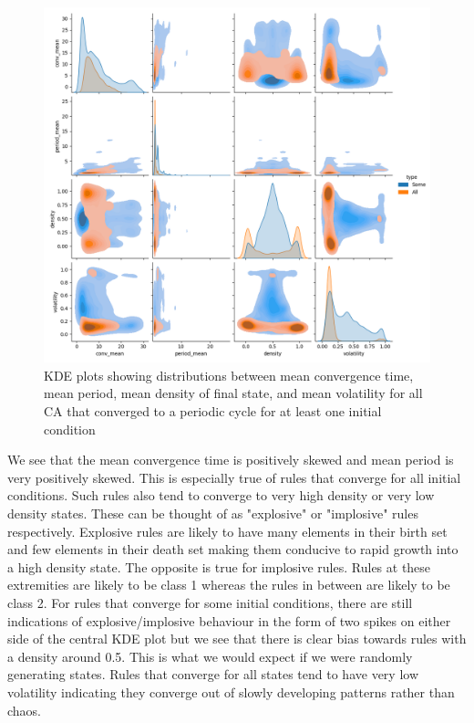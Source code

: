 \begin{figure}[!h]
\centering 
\includegraphics[width=\textwidth]{images/tax-pairplot.png}
\caption{KDE plots showing distributions between mean convergence time, mean period, mean density of final state, and mean volatility for all CA that converged to a periodic cycle for at least one initial condition}
\label{fig:tax-pairplot}
\end{figure}

We see that the mean convergence time is positively skewed and mean period is very positively skewed. This is especially true of rules that converge for all initial conditions. Such rules also tend to converge to very high density or very low density states. These can be thought of as "explosive" or "implosive" rules respectively. Explosive rules are likely to have many elements in their birth set and few elements in their death set making them conducive to rapid growth into a high density state. The opposite is true for implosive rules. Rules at these extremities are likely to be class 1 whereas the rules in between are likely to be class 2. For rules that converge for some initial conditions, there are still indications of explosive/implosive behaviour in the form of two spikes on either side of the central KDE plot but we see that there is clear bias towards rules with a density around 0.5. This is what we would expect if we were randomly generating states. Rules that converge for all states tend to have very low volatility indicating they converge out of slowly developing patterns rather than chaos.

